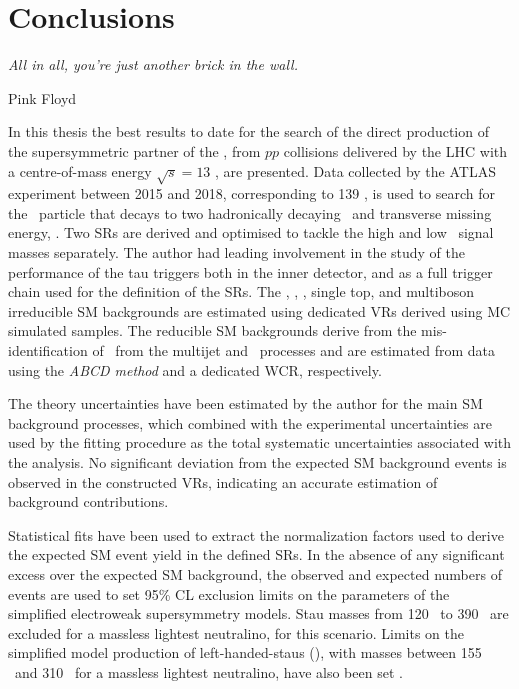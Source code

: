 \chapter*{Conclusions}
\epigraph{\emph{All in all, you're just another brick in the wall.}} {Pink Floyd}

 In this thesis the best results to date for the search of the direct production of the supersymmetric partner of the \ltau, from $pp$ collisions delivered by the \ac{LHC} with a centre-of-mass energy $\sqrt{s}=13$ \tev, are presented. 
Data collected by the \ac{ATLAS} experiment between 2015 and 2018, corresponding to 139 \infb, is used to search for the \stau\ particle that decays to two hadronically decaying \ltau\ and transverse missing energy, \met.
Two \acp{SR} are derived and optimised to tackle the high and low \stau\ signal masses separately. 
The author had leading involvement in the study of the performance of the tau triggers both in the inner detector, and as a full trigger chain used for the definition of the \acp{SR}. 
The \ttbar, \ttV, \Zjets, single top, and multiboson irreducible \ac{SM} backgrounds are estimated using dedicated \acp{VR} derived using \ac{MC} simulated samples. The reducible \ac{SM} backgrounds derive from the mis-identification of \ltau\ from the multijet and \Wjets\ processes and are estimated from data using the \textit{ABCD method} and a dedicated W\ac{CR}, respectively.

The theory uncertainties have been estimated by the author for the main \ac{SM} background processes, which combined with the experimental uncertainties are used by the fitting procedure as the total systematic uncertainties associated with the analysis. 
No significant deviation from the expected \ac{SM} background events is observed in the constructed \acp{VR}, indicating an accurate estimation of background contributions. 

Statistical fits have been used to extract the normalization factors used to derive the expected \ac{SM} event yield in the defined \acp{SR}. 
In the absence of any significant excess over the expected \ac{SM} background, the observed and expected numbers of events are used to set 95\% \ac{CL} exclusion limits on the parameters of the simplified electroweak supersymmetry models.
Stau masses from 120 \gev\ to 390 \gev\ are excluded for a massless lightest neutralino, for this scenario. 
Limits on the simplified model production of left-handed-staus (\stauL), with masses between 155 \gev\ and 310 \gev\ for a massless lightest neutralino, have also been set .

